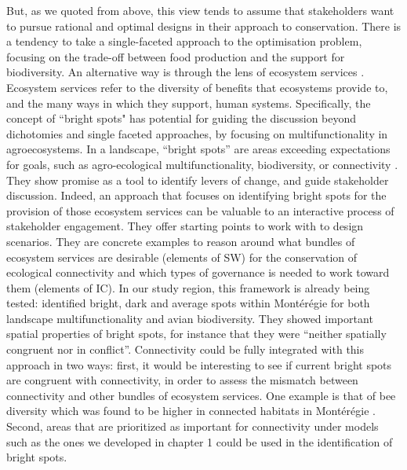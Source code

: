 \documentclass[12pt,Bold,TexShade]{thesis/mcgilletdclass}
\begin{document}
{But, as we quoted from \cite{williamson_spatially_2018} above, this view tends to assume that stakeholders want to pursue rational and optimal designs in their approach to conservation. There is a tendency to take a single-faceted approach to the optimisation problem, focusing on the trade-off between food production and the support for biodiversity. An alternative way is through the lens of ecosystem services  \cite{bennett_changing_2017}. Ecosystem services refer to the diversity of benefits that ecosystems provide to, and the many ways in which they support, human systems. Specifically, the concept of “bright spots" has potential for guiding the discussion beyond dichotomies and single faceted approaches, by focusing on multifunctionality in agroecosystems. In a landscape, “bright spots” are areas exceeding expectations for goals, such as agro-ecological multifunctionality, biodiversity, or connectivity \citep{frei_bright_2018}. They show promise as a tool to identify levers of change, and guide stakeholder discussion. Indeed, an approach that focuses on identifying bright spots for the provision of those ecosystem services can be valuable to an interactive process of stakeholder engagement. They offer starting points to work with to design scenarios. They are concrete examples to reason around what bundles of ecosystem services are desirable (elements of SW) for the conservation of ecological connectivity and which types of governance is needed to work toward them (elements of IC). In our study region, this framework is already being tested: \cite{frei_bright_2018} identified bright, dark and average spots within Montérégie for both landscape multifunctionality and avian biodiversity. They showed important spatial properties of bright spots, for instance that they were “neither spatially congruent nor in conflict”. Connectivity could be fully integrated with this approach in two ways: first, it would be interesting to see if current bright spots are congruent with connectivity, in order to assess the mismatch between connectivity and other bundles of ecosystem services. One example is that of bee diversity which was found to be higher in connected habitats in Montérégie \citep{martins_complementary_2018}. Second, areas that are prioritized as important for connectivity under models such as the ones we developed in chapter 1 could be used in the identification of bright spots. \\

}
\end{document}
